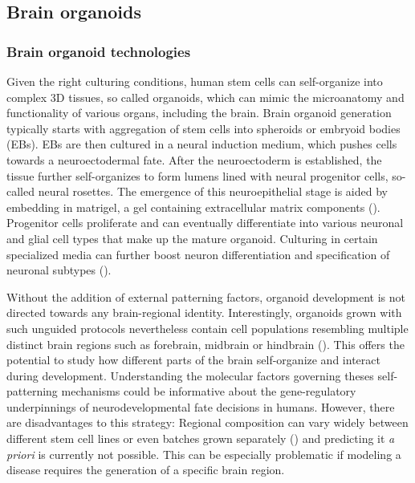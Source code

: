 \subsection{Brain organoids}


\subsubsection{Brain organoid technologies}
Given the right culturing conditions, human stem cells can self-organize into complex 3D tissues, so called organoids, which can mimic the microanatomy and functionality of various organs, including the brain. Brain organoid generation typically starts with aggregation of stem cells into spheroids or embryoid bodies (EBs). EBs are then cultured in a neural induction medium, which pushes cells towards a neuroectodermal fate. After the neuroectoderm is established, the tissue further self-organizes to form lumens lined with neural progenitor cells, so-called neural rosettes. The emergence of this neuroepithelial stage is aided by embedding in matrigel, a gel containing extracellular matrix components (\cite{lancaster_cerebral_2013,eiraku_self-organizing_2011}). Progenitor cells proliferate and can eventually differentiate into various neuronal and glial cell types that make up the mature organoid. Culturing in certain specialized media can further boost neuron differentiation and specification of neuronal subtypes (\cite{bardy_neuronal_2015}). 

Without the addition of external patterning factors, organoid development is not directed towards any brain-regional identity. Interestingly, organoids grown with such unguided protocols nevertheless contain cell populations resembling multiple distinct brain regions such as forebrain, midbrain or hindbrain (\cite{lancaster_cerebral_2013,kadoshima_self-organization_2013}). This offers the potential to study how different parts of the brain self-organize and interact during development. Understanding the molecular factors governing theses self-patterning mechanisms could be 
informative about the gene-regulatory underpinnings of neurodevelopmental fate decisions in humans. However, there are disadvantages to this strategy: Regional composition can vary widely between different stem cell lines or even batches grown separately (\cite{kanton_organoid_2019}) and predicting it \textit{a priori} is currently not possible. This can be especially problematic if modeling a disease requires the generation of a specific brain region.

